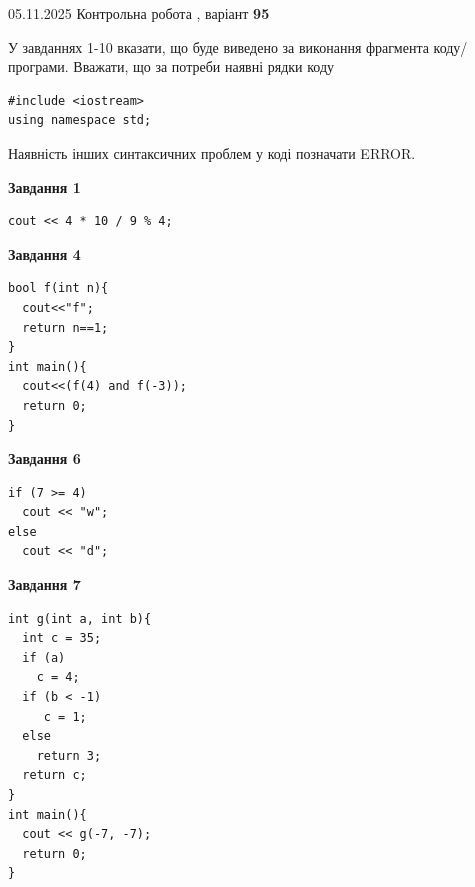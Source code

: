 \documentclass[12pt, ukrainian]{article}
\begin{document}
{\Large{05.11.2025 Контрольна робота , варіант  \No \textbf { 95 }\par}}
{
\begin {large}
У завданнях 1-10 вказати, що буде виведено за виконання фрагмента коду/про\-гра\-ми.
Вважати, що за потреби наявні рядки коду
\begin{verbatim}
#include <iostream>
using namespace std;
\end{verbatim}
Наявність інших синтаксичних проблем у коді позначати ERROR.

\begin{minipage}[t]{7.0cm}

\begin{center}
\textbf{Завдання 1}
\end{center}
\vspace{-8mm}

\begin{verbatim}
cout << 4 * 10 / 9 % 4;
\end{verbatim}



\begin{center}
\textbf{Завдання 4}
\end{center}
\vspace{-8mm}

\begin{verbatim}
bool f(int n){
  cout<<"f";
  return n==1;
}
int main(){
  cout<<(f(4) and f(-3));
  return 0;
}
\end{verbatim}



\begin{center}
\textbf{Завдання 6}
\end{center}
\vspace{-8mm}

\begin{verbatim}
if (7 >= 4)
  cout << "w";
else
  cout << "d";
\end{verbatim}



\begin{center}
\textbf{Завдання 7}
\end{center}
\vspace{-8mm}

\begin{verbatim}
int g(int a, int b){
  int c = 35;
  if (a)
    c = 4;
  if (b < -1)
     c = 1;
  else
    return 3;
  return c;
}
int main(){
  cout << g(-7, -7);
  return 0;
}
\end{verbatim}


\end{minipage}
\end{large}}
\end{document}
